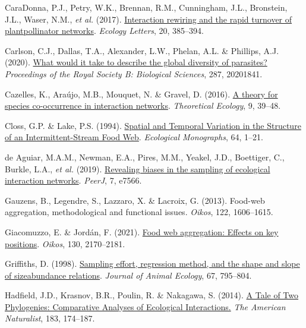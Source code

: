 \documentclass[10pt,oneside]{article}
\newlength{\cslhangindent}
\newenvironment{CSLReferences}[3] %
 {%
  \setlength{\parindent}{0pt}
  \ifodd #1 \everypar{\setlength{\hangindent}{\cslhangindent}}\ignorespaces\fi
  \ifnum #2 > 0
  \setlength{\parskip}{#2\baselineskip}
  \fi
 }%
 {}
\begin{document}
\begin{CSLReferences}{1}{0}
\leavevmode{}%
CaraDonna, P.J., Petry, W.K., Brennan, R.M., Cunningham, J.L.,
Bronstein, J.L., Waser, N.M., \emph{et al.} (2017).
\href{https://doi.org/10.1111/ele.12740}{Interaction rewiring and the
rapid turnover of plantpollinator networks}. \emph{Ecology Letters}, 20,
385--394.

\leavevmode{}%
Carlson, C.J., Dallas, T.A., Alexander, L.W., Phelan, A.L. \& Phillips,
A.J. (2020). \href{https://doi.org/10.1098/rspb.2020.1841}{What would it
take to describe the global diversity of parasites?} \emph{Proceedings
of the Royal Society B: Biological Sciences}, 287, 20201841.

\leavevmode{}%
Cazelles, K., Araújo, M.B., Mouquet, N. \& Gravel, D. (2016).
\href{https://doi.org/10.1007/s12080-015-0281-9}{A theory for species
co-occurrence in interaction networks}. \emph{Theoretical Ecology}, 9,
39--48.

\leavevmode{}%
Closs, G.P. \& Lake, P.S. (1994).
\href{https://doi.org/10.2307/2937053}{Spatial and Temporal Variation in
the Structure of an Intermittent-Stream Food Web}. \emph{Ecological
Monographs}, 64, 1--21.

\leavevmode{}%
de Aguiar, M.A.M., Newman, E.A., Pires, M.M., Yeakel, J.D., Boettiger,
C., Burkle, L.A., \emph{et al.} (2019).
\href{https://doi.org/10.7717/peerj.7566}{Revealing biases in the
sampling of ecological interaction networks}. \emph{PeerJ}, 7, e7566.

\leavevmode{}%
Gauzens, B., Legendre, S., Lazzaro, X. \& Lacroix, G. (2013). Food-web
aggregation, methodological and functional issues. \emph{Oikos}, 122,
1606--1615.

\leavevmode{}%
Giacomuzzo, E. \& Jordán, F. (2021).
\href{https://doi.org/10.1111/oik.08541}{Food web aggregation: Effects
on key positions}. \emph{Oikos}, 130, 2170--2181.

\leavevmode{}%
Griffiths, D. (1998).
\href{https://doi.org/10.1046/j.1365-2656.1998.00244.x}{Sampling effort,
regression method, and the shape and slope of sizeabundance relations}.
\emph{Journal of Animal Ecology}, 67, 795--804.

\leavevmode{}%
Hadfield, J.D., Krasnov, B.R., Poulin, R. \& Nakagawa, S. (2014).
\href{https://doi.org/10.1086/674445}{A Tale of Two Phylogenies:
Comparative Analyses of Ecological Interactions.} \emph{The American
Naturalist}, 183, 174--187.


\end{CSLReferences}
\end{document}
